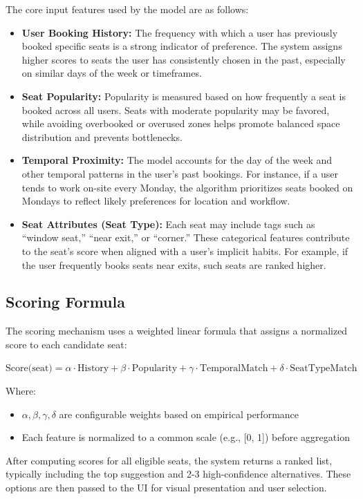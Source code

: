 \documentclass[12pt,a4paper]{report} %
\begin{document}
The core input features used by the model are as follows:

\begin{itemize}
\item \textbf{User Booking History:}
The frequency with which a user has previously booked specific seats is a strong indicator of preference. The system assigns higher scores to seats the user has consistently chosen in the past, especially on similar days of the week or timeframes.
\item \textbf{Seat Popularity:}  
Popularity is measured based on how frequently a seat is booked across all users. Seats with moderate popularity may be favored, while avoiding overbooked or overused zones helps promote balanced space distribution and prevents bottlenecks.
\item \textbf{Temporal Proximity:}  
The model accounts for the day of the week and other temporal patterns in the user's past bookings. For instance, if a user tends to work on-site every Monday, the algorithm prioritizes seats booked on Mondays to reflect likely preferences for location and workflow.
\item \textbf{Seat Attributes (Seat Type):}  
Each seat may include tags such as “window seat,” “near exit,” or “corner.” These categorical features contribute to the seat's score when aligned with a user's implicit habits. For example, if the user frequently books seats near exits, such seats are ranked higher.
\end{itemize}

\subsection*{Scoring Formula}

The scoring mechanism uses a weighted linear formula that assigns a normalized score to each candidate seat:

\(\text{Score(seat)} = \alpha \cdot \text{History} + \beta \cdot \text{Popularity} + \gamma \cdot \text{TemporalMatch} + \delta \cdot \text{SeatTypeMatch}\)

Where:
\begin{itemize}
\item $\alpha, \beta, \gamma, \delta$ are configurable weights based on empirical performance
\item Each feature is normalized to a common scale (e.g., [0, 1]) before aggregation
\end{itemize}

After computing scores for all eligible seats, the system returns a ranked list, typically including the top suggestion and 2-3 high-confidence alternatives. These options are then passed to the UI for visual presentation and user selection.
\end{document}
